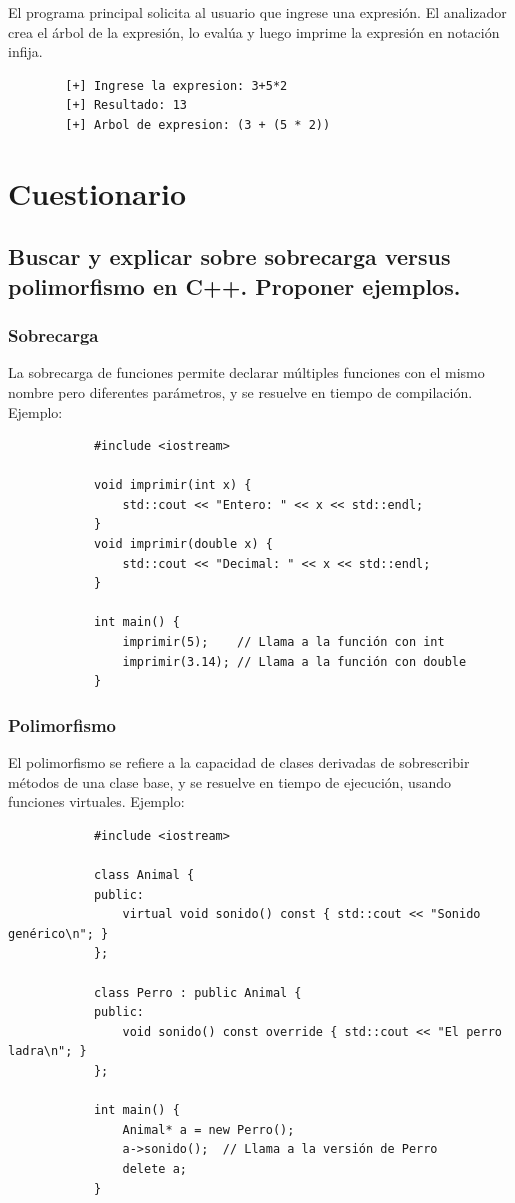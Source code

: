 \documentclass{article}
\begin{document}
        El programa principal solicita al usuario que ingrese una expresión. El analizador crea el árbol de la expresión, lo evalúa y luego imprime la expresión en notación infija.
        
        \begin{verbatim}
        [+] Ingrese la expresion: 3+5*2
        [+] Resultado: 13
        [+] Arbol de expresion: (3 + (5 * 2))
        \end{verbatim}

\section{Cuestionario}
        \subsection{Buscar y explicar sobre sobrecarga versus polimorfismo en C++. Proponer ejemplos.}
            \subsubsection{Sobrecarga}
            La sobrecarga de funciones permite declarar múltiples funciones con el mismo nombre pero diferentes parámetros, y se resuelve en tiempo de compilación. Ejemplo:
            
            \begin{verbatim}
            #include <iostream>
            
            void imprimir(int x) {
                std::cout << "Entero: " << x << std::endl;
            }
            void imprimir(double x) {
                std::cout << "Decimal: " << x << std::endl;
            }
            
            int main() {
                imprimir(5);    // Llama a la función con int
                imprimir(3.14); // Llama a la función con double
            }
            \end{verbatim}
            
            \subsubsection{Polimorfismo}
            El polimorfismo se refiere a la capacidad de clases derivadas de sobrescribir métodos de una clase base, y se resuelve en tiempo de ejecución, usando funciones virtuales. Ejemplo:
            
            \begin{verbatim}
            #include <iostream>
            
            class Animal {
            public:
                virtual void sonido() const { std::cout << "Sonido genérico\n"; }
            };
            
            class Perro : public Animal {
            public:
                void sonido() const override { std::cout << "El perro ladra\n"; }
            };
            
            int main() {
                Animal* a = new Perro();
                a->sonido();  // Llama a la versión de Perro
                delete a;
            }
            \end{verbatim}
            
\end{document}
